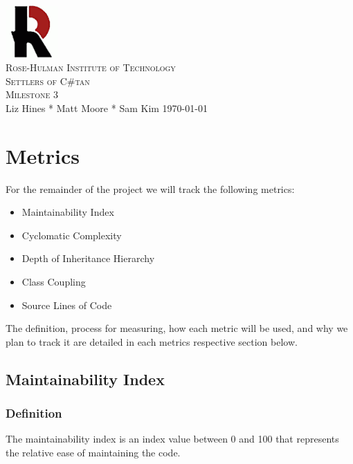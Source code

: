 \documentclass[12pt]{article}
\begin{document}
\begin{titlepage}
\begin{center}
\includegraphics[width=0.15\textwidth]{Images/logo}\\[1cm]
\textsc{\LARGE Rose-Hulman Institute of Technology}\\[1.5cm]
\textsc{\Large Settlers of C\#tan}\\[1.0cm]
\textsc{\Large Milestone 3}\\[1.0cm]
\Large Liz Hines \hspace{0.2cm}*\hspace{0.2cm}  Matt Moore \hspace{0.2cm}*\hspace{0.2cm} Sam	Kim
\vfill
\large \today
\end{center}
\end{titlepage}

\newpage
{\small \tableofcontents}
\newpage

\section{Metrics}
For the remainder of the project we will track the following metrics:

\begin{itemize}
\item Maintainability Index
\item Cyclomatic Complexity
\item Depth of Inheritance Hierarchy
\item Class Coupling
\item Source Lines of Code
\end{itemize}

The definition, process for measuring, how each metric will be used, and why we plan to track it are detailed in each metrics respective section below.

\subsection{Maintainability Index}
\subsubsection{Definition}
The maintainability index is an index value between 0 and 100 that represents the relative ease of maintaining the code.
\end{document}
